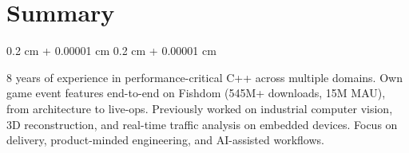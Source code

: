 \documentclass[10pt, letterpaper]{article}
\newenvironment{onecolentry}{
    \begin{adjustwidth}{
        0.2 cm + 0.00001 cm
    }{
        0.2 cm + 0.00001 cm
    }
}{
    \end{adjustwidth}
}
\begin{document}
    \vspace{0.3 cm - 0.3 cm}


    \section{Summary}
        \begin{onecolentry}
            8 years of experience in performance-critical C++ across multiple domains. Own game event features end-to-end on Fishdom (545M+ downloads, 15M MAU), from architecture to live-ops. Previously worked on industrial computer vision, 3D reconstruction, and real-time traffic analysis on embedded devices. Focus on delivery, product-minded engineering, and AI-assisted workflows.
        \end{onecolentry}

\end{document}
